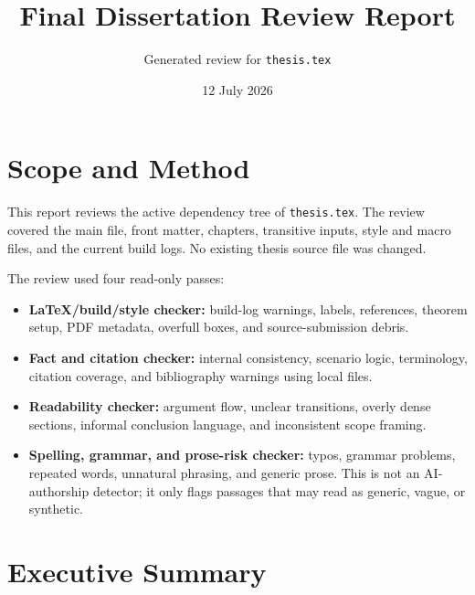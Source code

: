 \documentclass[11pt,a4paper]{article}
\title{Final Dissertation Review Report}
\author{Generated review for \texttt{thesis.tex}}
\date{12 July 2026}
\newcommand{\loc}[1]{\texttt{#1}}
\begin{document}
\maketitle

\section*{Scope and Method}

This report reviews the active dependency tree of \loc{thesis.tex}. The review
covered the main file, front matter, chapters, transitive inputs, style and macro
files, and the current build logs. No existing thesis source file was changed.

The review used four read-only passes:
\begin{itemize}
  \item \textbf{LaTeX/build/style checker:} build-log warnings, labels, references,
  theorem setup, PDF metadata, overfull boxes, and source-submission debris.
  \item \textbf{Fact and citation checker:} internal consistency, scenario logic,
  terminology, citation coverage, and bibliography warnings using local files.
  \item \textbf{Readability checker:} argument flow, unclear transitions, overly dense
  sections, informal conclusion language, and inconsistent scope framing.
  \item \textbf{Spelling, grammar, and prose-risk checker:} typos, grammar problems,
  repeated words, unnatural phrasing, and generic prose. This is not an AI-authorship
  detector; it only flags passages that may read as generic, vague, or synthetic.
\end{itemize}

\section*{Executive Summary}
\end{document}
